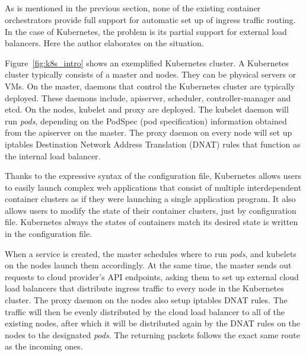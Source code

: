 \subsection{}

As is mentioned in the previous section, none of the existing container orchestrators provide full support for automatic set up of ingress traffic routing.
In the case of Kubernetes, the problem is its partial support for external load balancers.
Here the author elaborates on the situation.

Figure~\ref{fig:k8s_intro} shows an exemplified Kubernetes cluster.
A Kubernetes cluster typically consists of a master and nodes. They can be physical servers or VMs.
On the master, daemons that control the Kubernetes cluster are typically deployed. 
These daemons include, apiserver, scheduler, controller-manager and etcd. 
On the nodes, kubelet and proxy are deployed.
The kubelet daemon will run {\it pods}, depending on the PodSpec (pod specification) information obtained from the apiserver on the master.
The proxy daemon on every node will set up iptables Destination Network Address Translation (DNAT) rules that function as the internal load balancer.

Thanks to the expressive syntax of the configuration file, Kubernetes allows users to easily launch complex web applications that consist of multiple interdependent container clusters as if they were launching a single application program.
It also allows users to modify the state of their container clusters, just by  configuration file.
Kubernetes always  the states of containers  match its desired state is written in the configuration file.

When a service is created, the master schedules where to run {\em pods}, and  kubelets on the nodes launch them accordingly.
At the same time, the master sends out requests to cloud provider's API endpoints, asking them to set up external cloud load balancers that distribute ingress traffic to every node in the Kubernetes cluster.
The proxy daemon on the nodes also setup iptables DNAT rules. 
The  traffic will then be evenly distributed by the cloud load balancer to all of the existing nodes, 
after which it will be distributed again by the DNAT rules on the nodes to the designated {\em pods}. 
The returning packets follows the exact same route as the incoming ones.

